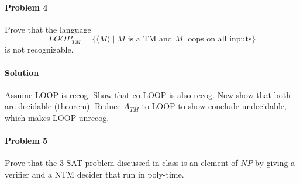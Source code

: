 \documentclass{article}
\begin{document}
\paragraph{Problem 4} Prove that the language
\[ LOOP_{TM} = \{ \langle M \rangle \;|\; M \text{ is a TM and $M$ loops on all inputs} \} \]
is not recognizable.
\\
\paragraph{Solution} Assume LOOP is recog. Show that co-LOOP is also recog. Now show that both are decidable (theorem). Reduce $A_{TM}$ to LOOP to show conclude undecidable, which makes LOOP unrecog.

\paragraph{Problem 5} Prove that the 3-SAT problem discussed in class is an element of $NP$ by
giving a verifier and a NTM decider that run in poly-time.
\end{document}
